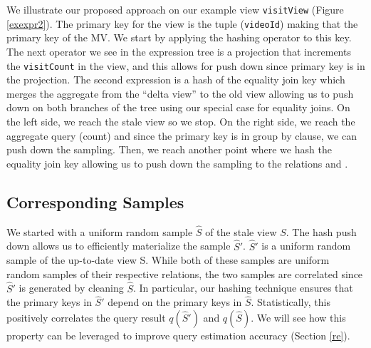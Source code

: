 \begin{example}
We illustrate our proposed approach on our example view \texttt{visitView} (Figure \ref{exexpr2}). 
The primary key for the view is the tuple (\texttt{videoId}) making that the primary key of the MV.
We start by applying the hashing operator to this key.
The next operator we see in the expression tree is a projection that increments the \texttt{visitCount} in the view, and this allows
for push down since primary key is in the projection.
The second expression is a hash of the equality join key which merges the aggregate from the ``delta view'' to the old view allowing us to push down on both branches of the tree using our special case for equality joins.
On the left side, we reach the stale view so we stop.
On the right side, we reach the aggregate query (count) and since the primary key is in group by clause, we can push down the sampling.
Then, we reach another point where we hash the equality join key allowing us to push down the sampling to the relations  and .
\end{example}

\subsection{Corresponding Samples}
We started with a uniform random sample $\widehat{S}$ of the stale view $S$.
The hash push down allows us to efficiently materialize the sample $\widehat{S}'$.
$\widehat{S}'$ is a uniform random sample of the up-to-date view S.
While both of these samples are uniform random samples of their respective relations, 
the two samples are correlated since $\widehat{S}'$ is generated by cleaning $\widehat{S}$.
In particular, our hashing technique ensures that the primary keys in $\widehat{S}'$ depend on the primary keys in $\widehat{S}$.
Statistically, this positively correlates the query result $q(\widehat{S}')$ and $q(\widehat{S})$. 
We will see how this property can be leveraged to improve query estimation accuracy (Section \ref{re}). 

